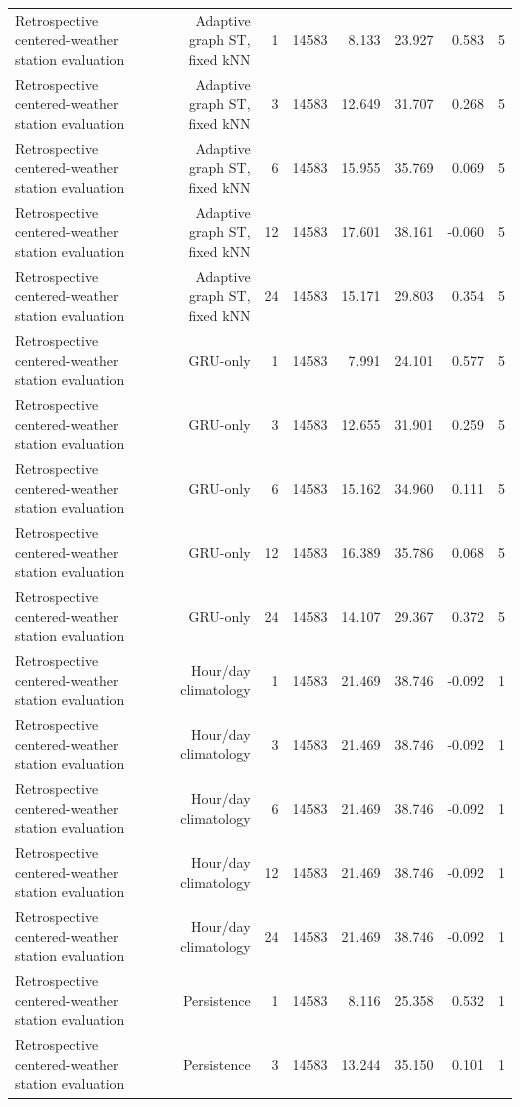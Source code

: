 \begin{table}[t]
\begin{tabular}{lrrrrrrr}
Retrospective centered-weather station evaluation & Adaptive graph ST, fixed kNN & 1 & 14583 & 8.133 & 23.927 & 0.583 & 5 \\
Retrospective centered-weather station evaluation & Adaptive graph ST, fixed kNN & 3 & 14583 & 12.649 & 31.707 & 0.268 & 5 \\
Retrospective centered-weather station evaluation & Adaptive graph ST, fixed kNN & 6 & 14583 & 15.955 & 35.769 & 0.069 & 5 \\
Retrospective centered-weather station evaluation & Adaptive graph ST, fixed kNN & 12 & 14583 & 17.601 & 38.161 & -0.060 & 5 \\
Retrospective centered-weather station evaluation & Adaptive graph ST, fixed kNN & 24 & 14583 & 15.171 & 29.803 & 0.354 & 5 \\
Retrospective centered-weather station evaluation & GRU-only & 1 & 14583 & 7.991 & 24.101 & 0.577 & 5 \\
Retrospective centered-weather station evaluation & GRU-only & 3 & 14583 & 12.655 & 31.901 & 0.259 & 5 \\
Retrospective centered-weather station evaluation & GRU-only & 6 & 14583 & 15.162 & 34.960 & 0.111 & 5 \\
Retrospective centered-weather station evaluation & GRU-only & 12 & 14583 & 16.389 & 35.786 & 0.068 & 5 \\
Retrospective centered-weather station evaluation & GRU-only & 24 & 14583 & 14.107 & 29.367 & 0.372 & 5 \\
Retrospective centered-weather station evaluation & Hour/day climatology & 1 & 14583 & 21.469 & 38.746 & -0.092 & 1 \\
Retrospective centered-weather station evaluation & Hour/day climatology & 3 & 14583 & 21.469 & 38.746 & -0.092 & 1 \\
Retrospective centered-weather station evaluation & Hour/day climatology & 6 & 14583 & 21.469 & 38.746 & -0.092 & 1 \\
Retrospective centered-weather station evaluation & Hour/day climatology & 12 & 14583 & 21.469 & 38.746 & -0.092 & 1 \\
Retrospective centered-weather station evaluation & Hour/day climatology & 24 & 14583 & 21.469 & 38.746 & -0.092 & 1 \\
Retrospective centered-weather station evaluation & Persistence & 1 & 14583 & 8.116 & 25.358 & 0.532 & 1 \\
Retrospective centered-weather station evaluation & Persistence & 3 & 14583 & 13.244 & 35.150 & 0.101 & 1 \\

\end{tabular}
\end{table}
